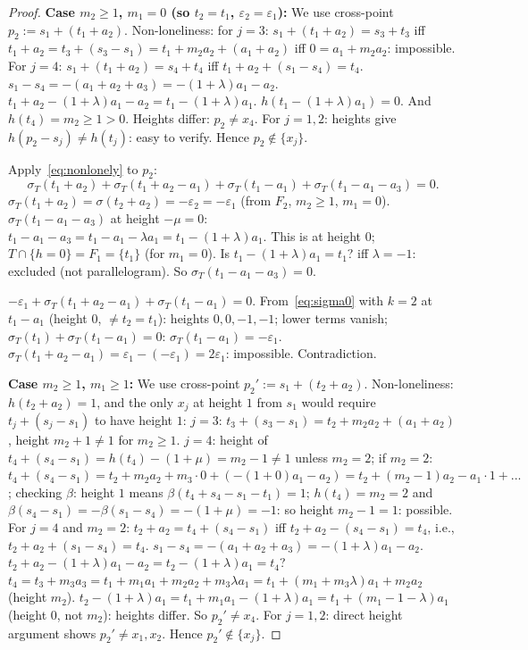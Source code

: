 \documentclass{article}
\begin{document}
\begin{proof}
\textbf{Case $m_2\ge 1$, $m_1=0$ (so $t_2=t_1$, $\varepsilon_2=\varepsilon_1$):}
We use cross-point $p_2:=s_1+(t_1+a_2)$.
Non-loneliness: for $j=3$: $s_1+(t_1+a_2)=s_3+t_3$ iff $t_1+a_2=t_3+(s_3-s_1)=t_1+m_2a_2+(a_1+a_2)$ iff $0=a_1+m_2a_2$: impossible.
For $j=4$: $s_1+(t_1+a_2)=s_4+t_4$ iff $t_1+a_2+(s_1-s_4)=t_4$.
$s_1-s_4=-(a_1+a_2+a_3)=-(1+\lambda)a_1-a_2$.  $t_1+a_2-(1+\lambda)a_1-a_2=t_1-(1+\lambda)a_1$.
$h(t_1-(1+\lambda)a_1)=0$.  And $h(t_4)=m_2\ge 1>0$.  Heights differ: $p_2\ne x_4$.
For $j=1,2$: heights give $h(p_2-s_j)\ne h(t_j)$: easy to verify.  Hence $p_2\notin\{x_j\}$.

Apply~\eqref{eq:nonlonely} to $p_2$:
\[
  \sigma_T(t_1+a_2)+\sigma_T(t_1+a_2-a_1)+\sigma_T(t_1-a_1)+\sigma_T(t_1-a_1-a_3)=0.
\]
$\sigma_T(t_1+a_2)=\sigma(t_2+a_2)=-\varepsilon_2=-\varepsilon_1$ (from $F_2$, $m_2\ge 1$, $m_1=0$).
$\sigma_T(t_1-a_1-a_3)$ at height $-\mu=0$: $t_1-a_1-a_3=t_1-a_1-\lambda a_1=t_1-(1+\lambda)a_1$.
This is at height $0$; $T\cap\{h=0\}=F_1=\{t_1\}$ (for $m_1=0$).
Is $t_1-(1+\lambda)a_1=t_1$? iff $\lambda=-1$: excluded (not parallelogram).
So $\sigma_T(t_1-a_1-a_3)=0$.

$-\varepsilon_1+\sigma_T(t_1+a_2-a_1)+\sigma_T(t_1-a_1)=0$.
From~\eqref{eq:sigma0} with $k=2$ at $t_1-a_1$ (height $0$, $\ne t_2=t_1$):
heights $0,0,-1,-1$; lower terms vanish; $\sigma_T(t_1)+\sigma_T(t_1-a_1)=0$:
$\sigma_T(t_1-a_1)=-\varepsilon_1$.
$\sigma_T(t_1+a_2-a_1)=\varepsilon_1-(-\varepsilon_1)=2\varepsilon_1$: impossible.  Contradiction.

\textbf{Case $m_2\ge 1$, $m_1\ge 1$:}
We use cross-point $p_2':=s_1+(t_2+a_2)$.
Non-loneliness: $h(t_2+a_2)=1$, and the only $x_j$ at height $1$ from $s_1$ would require $t_j+(s_j-s_1)$ to have height $1$:
$j=3$: $t_3+(s_3-s_1)=t_2+m_2a_2+(a_1+a_2)$, height $m_2+1\ne 1$ for $m_2\ge 1$.
$j=4$: height of $t_4+(s_4-s_1)=h(t_4)-(1+\mu)=m_2-1\ne 1$ unless $m_2=2$; if $m_2=2$: $t_4+(s_4-s_1)=t_2+m_2a_2+m_3\cdot 0+(-(1+0)a_1-a_2)=t_2+(m_2-1)a_2-a_1\cdot 1+...$; checking $\beta$: height $1$ means $\beta(t_4+s_4-s_1-t_1)=1$; $h(t_4)=m_2=2$ and $\beta(s_4-s_1)=-\beta(s_1-s_4)=-(1+\mu)=-1$: so height $m_2-1=1$: possible.
For $j=4$ and $m_2=2$: $t_2+a_2=t_4+(s_4-s_1)$ iff $t_2+a_2-(s_4-s_1)=t_4$, i.e., $t_2+a_2+(s_1-s_4)=t_4$.
$s_1-s_4=-(a_1+a_2+a_3)=-(1+\lambda)a_1-a_2$.
$t_2+a_2-(1+\lambda)a_1-a_2=t_2-(1+\lambda)a_1=t_4$?
$t_4=t_3+m_3a_3=t_1+m_1a_1+m_2a_2+m_3\lambda a_1=t_1+(m_1+m_3\lambda)a_1+m_2a_2$ (height $m_2$).
$t_2-(1+\lambda)a_1=t_1+m_1a_1-(1+\lambda)a_1=t_1+(m_1-1-\lambda)a_1$ (height $0$, not $m_2$): heights differ. So $p_2'\ne x_4$.
For $j=1,2$: direct height argument shows $p_2'\ne x_1,x_2$.
Hence $p_2'\notin\{x_j\}$.


\end{proof}
\end{document}
